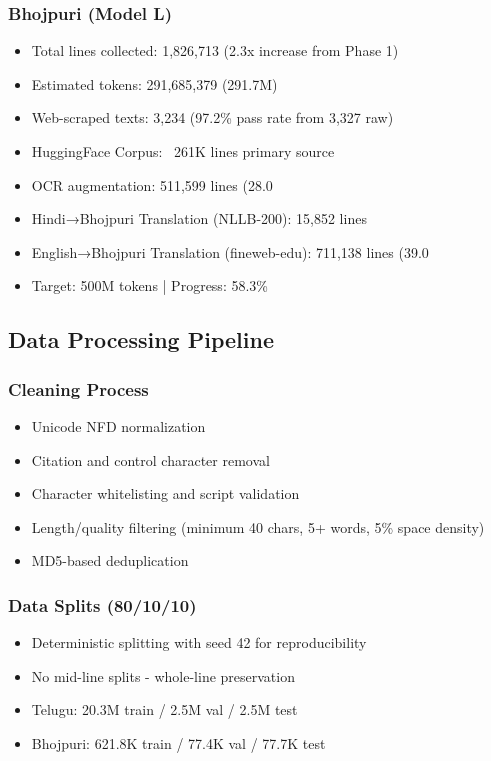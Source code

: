 \documentclass[11pt,a4paper]{article}
\begin{document}
\subsubsection{Bhojpuri (Model L)}
\begin{itemize}
    \item Total lines collected: 1,826,713 (2.3x increase from Phase 1)
    \item Estimated tokens: 291,685,379 (291.7M)
    \item Web-scraped texts: 3,234 (97.2\% pass rate from 3,327 raw)
    \item HuggingFace Corpus: ~261K lines primary source
    \item OCR augmentation: 511,599 lines (28.0%
    \item Hindi→Bhojpuri Translation (NLLB-200): 15,852 lines
    \item English→Bhojpuri Translation (fineweb-edu): 711,138 lines (39.0%
    \item Target: 500M tokens | Progress: 58.3\%
\end{itemize}

\subsection{Data Processing Pipeline}

\subsubsection{Cleaning Process}
\begin{itemize}
    \item Unicode NFD normalization
    \item Citation and control character removal
    \item Character whitelisting and script validation
    \item Length/quality filtering (minimum 40 chars, 5+ words, 5\% space density)
    \item MD5-based deduplication
\end{itemize}

\subsubsection{Data Splits (80/10/10)}
\begin{itemize}
    \item Deterministic splitting with seed 42 for reproducibility
    \item No mid-line splits - whole-line preservation
    \item Telugu: 20.3M train / 2.5M val / 2.5M test
    \item Bhojpuri: 621.8K train / 77.4K val / 77.7K test
\end{itemize}
\end{document}
